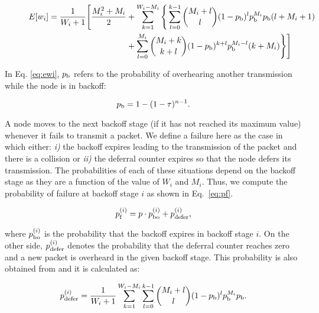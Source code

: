 \documentclass[preprint,12pt]{elsarticle}
\begin{document}
\begin{figure*}[!t]
\begin{equation}\label{eq:ewi}
\begin{split}
 E[w_i] = \frac{1}{W_i+1} \Bigg[ \frac{M_i^2+M_i}{2} &+ \sum_{k=1}^{W_i-M_i} \Bigg\{ \sum_{l=0}^{k-1} \binom{M_i+l}{l} (1-p_{\rm b})^l p_{\rm b}^{M_i} p_{\rm b} (l+M_i+1) \\
	  & + \sum_{l=0}^{M_i} \binom{M_i+k}{k+l} (1-p_{\rm b})^{k+l} p_{\rm b}^{M_i-l} (k+M_i) \Bigg\} \Bigg]
\end{split}
\end{equation}
\end{figure*}

In Eq. \ref{eq:ewi}, $p_{\rm b}$ refers to the probability of overhearing another transmission while the node is in backoff:

\begin{equation}\label{eq:pb}
 p_{\rm b}=1-(1-\tau)^{n-1}.
\end{equation}

A node moves to the next backoff stage (if it has not reached its maximum value) whenever it fails to transmit a packet. We define a failure here as the case in which either: \emph{i)} the backoff expires leading to the transmission of the packet and there is a collision or \emph{ii)} the deferral counter expires so that the node defers its transmission. The probabilities of each of these situations depend on the backoff stage as they are a function of the value of $W_i$ and $M_i$. Thus, we compute the probability of failure at backoff stage $i$ as shown in Eq.~\ref{eq:pf}. 

\begin{equation}\label{eq:pf}
p_{\rm f}^{(i)} =p \cdot p_{\rm bo}^{(i)} + p_{\rm defer}^{(i)},
\end{equation}

where $p_{\rm bo}^{(i)}$ is the probability that the backoff expires in backoff stage $i$. On the other side, $p_{\rm defer}^{(i)}$ denotes the probability that the deferral counter reaches zero and a new packet is overheard in the given backoff stage. This probability is also obtained from \cite{chung2006performance} and it is calculated as:

\begin{equation}\label{eq:pdefer}
 p_{\rm defer}^{(i)} = \frac{1}{W_i+1} \sum_{k=1}^{W_i-M_i} \sum_{l=0}^{k-1} \binom{M_i+l}{l} (1-p_{\rm b})^l p_{\rm b}^{M_i} p_{\rm b}.
\end{equation}
\end{document}
